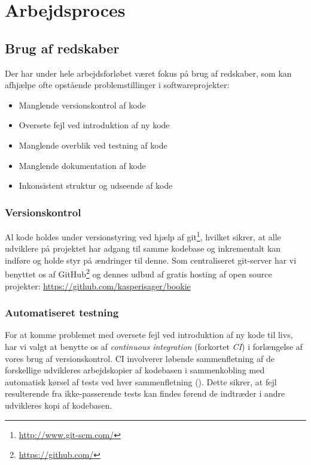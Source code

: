 \chapter{Arbejdsproces}

\section{Brug af redskaber}

Der har under hele arbejdsforløbet været fokus på brug af redskaber, som kan afhjælpe ofte opstående problemstillinger i softwareprojekter:

\begin{itemize}
  \item Manglende versionskontrol af kode
  \item Oversete fejl ved introduktion af ny kode
  \item Manglende overblik ved testning af kode
  \item Manglende dokumentation af kode
  \item Inkonsistent struktur og udseende af kode
\end{itemize}

\subsection{Versionskontrol}

Al kode holdes under versionstyring ved hjælp af git\footnote{\url{http://www.git-scm.com/}}, hvilket sikrer, at alle udviklere på projektet har adgang til samme kodebase og inkrementalt kan indføre og holde styr på ændringer til denne. Som centraliseret git-server har vi benyttet os af GitHub\footnote{\url{https://github.com/}} og dennes udbud af gratis hosting af open source projekter: \url{https://github.com/kasperisager/bookie}

\subsection{Automatiseret testning}

For at komme problemet med oversete fejl ved introduktion af ny kode til livs, har vi valgt at benytte os af \textit{continuous integration} (forkortet \textit{CI}) i forlængelse af vores brug af versionskontrol. CI involverer løbende sammenfletning af de forskellige udvikleres arbejdskopier af kodebasen i sammenkobling med automatisk kørsel af tests ved hver sammenfletning (\cite{wiki:ci}). Dette sikrer, at fejl resulterende fra ikke-passerende tests kan findes førend de indtræder i andre udvikleres kopi af kodebasen.

